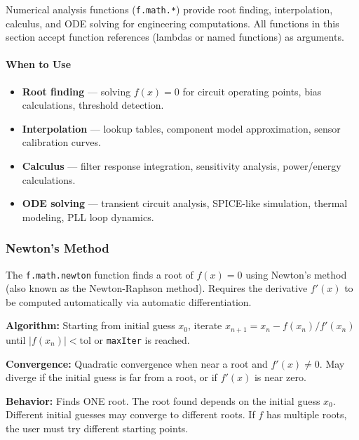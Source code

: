 Numerical analysis functions (\texttt{f.math.*}) provide root finding, interpolation, calculus, and ODE solving for engineering computations. All functions in this section accept function references (lambdas or named functions) as arguments.

\paragraph{When to Use}
\begin{itemize}
\item \textbf{Root finding} --- solving $f(x) = 0$ for circuit operating points, bias calculations, threshold detection.
\item \textbf{Interpolation} --- lookup tables, component model approximation, sensor calibration curves.
\item \textbf{Calculus} --- filter response integration, sensitivity analysis, power/energy calculations.
\item \textbf{ODE solving} --- transient circuit analysis, SPICE-like simulation, thermal modeling, PLL loop dynamics.
\end{itemize}

\subsubsection{Newton's Method}
The \texttt{f.math.newton} function finds a root of $f(x) = 0$ using Newton's method (also known as the Newton-Raphson method). Requires the derivative $f'(x)$ to be computed automatically via automatic differentiation.

\textbf{Algorithm:} Starting from initial guess $x_0$, iterate $x_{n+1} = x_n - f(x_n) / f'(x_n)$ until $|f(x_n)| < \text{tol}$ or \texttt{maxIter} is reached.

\textbf{Convergence:} Quadratic convergence when near a root and $f'(x) \neq 0$. May diverge if the initial guess is far from a root, or if $f'(x)$ is near zero.

\textbf{Behavior:} Finds ONE root. The root found depends on the initial guess $x_0$. Different initial guesses may converge to different roots. If $f$ has multiple roots, the user must try different starting points.

